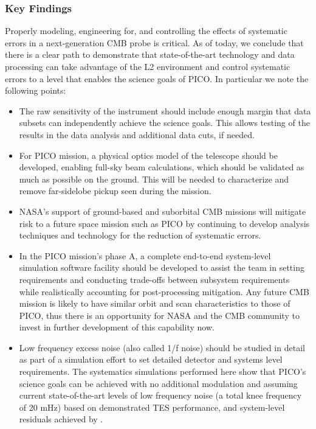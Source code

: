\documentclass[PICOReport.tex]{subfiles}
\begin{document}
\subsubsection{Key Findings}
\label{sec:systematics_key}

Properly modeling, engineering for, and controlling the effects of systematic errors in a
next-generation CMB probe is critical.  As of today, we conclude that there is a clear path to demonstrate that state-of-the-art technology and data processing can take advantage of the L2 environment and control systematic errors to a level that enables the science goals of PICO. In particular we note the following points:
\begin{itemize}
\item The raw sensitivity of the instrument should include enough margin
that data subsets can independently achieve the science goals.
This allows testing of the results in the data analysis and additional
data cuts, if needed.
\item For PICO mission, a physical optics model of the telescope should be developed, enabling full-sky beam calculations, which should be validated as much as possible on the ground.  This will be needed to characterize and remove far-sidelobe pickup seen during the mission. 
\item NASA's support of ground-based and suborbital CMB missions will mitigate risk to a future space mission such as PICO by continuing to develop analysis techniques and technology for the reduction of systematic errors.

\item In the PICO mission's phase A, a complete end-to-end system-level
simulation software facility should be developed to assist the team in setting 
requirements and conducting trade-offs between subsystem requirements while
realistically accounting for post-processing mitigation.  Any future
CMB mission is likely to have similar orbit  
and scan characteristics to those of PICO, thus there is an opportunity for NASA and
the CMB community to invest in further development of this capability now.
\item Low frequency excess noise (also called 1/f noise) should be studied in detail as part of a simulation effort to set detailed detector and systems level requirements.  The systematics simulations performed here show that PICO's science goals can be achieved with no additional modulation and assuming current state-of-the-art levels of low frequency noise (a total knee frequency of 20 mHz) based on demonstrated TES performance, and system-level residuals achieved by \planck.
\end{itemize}
\end{document}
